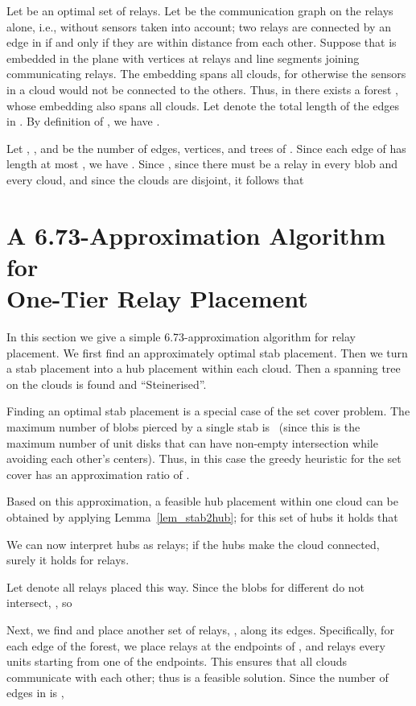 \documentclass[11pt,a4paper]{article}
\theoremstyle{definition}
\theoremstyle{remark}
\newcommand{\mytitlebreak}{\texorpdfstring{\\}{ }}
\begin{document}
Let  be an optimal set of relays.  Let  be the communication graph on the relays  alone, i.e., without sensors taken into account; two relays are connected by an edge in  if and only if they are within distance  from each other. Suppose that  is embedded in the plane with vertices at relays and line segments joining communicating relays.  The embedding spans all clouds, for otherwise the sensors in a cloud would not be connected to the others. Thus, in  there exists a forest , whose embedding also spans all clouds. Let  denote the total length of the edges in . By definition of , we have .

Let , , and  be the number of edges, vertices, and trees of .  Since each edge of  has length at most , we have . Since , since there must be a relay in every blob and every cloud, and since the clouds are disjoint, it follows that




\section{A 6.73-Approximation Algorithm for\mytitlebreak One-Tier Relay Placement}\label{sec_apx1tier}

In this section we give a simple 6.73-approximation algorithm for relay placement.  We first find an approximately optimal stab placement. Then we turn a stab placement into a hub placement within each cloud. Then a spanning tree on the clouds is found and ``Steinerised''.

Finding an optimal stab placement is a special case of the set cover problem. The maximum number of blobs pierced by a single stab is~ (since this is the maximum number of unit disks that can have non-empty intersection while avoiding each other's centers). Thus, in this case the greedy heuristic for the set cover has an approximation ratio of  \cite[Theorem~35.4]{cormen01introduction}.

Based on this approximation, a feasible hub placement  within one cloud  can be obtained by applying Lemma~\ref{lem_stab2hub}; for this set of hubs it holds that

We can now interpret hubs  as relays; if the hubs make the cloud  connected, surely it holds for relays.

Let  denote all relays placed this way. Since the blobs  for different  do not intersect, , so


Next, we find  and place another set of relays, , along its edges.  Specifically, for each edge  of the forest, we place  relays at the endpoints of , and   relays every  units starting from one of the endpoints. This ensures that all clouds communicate with each other; thus  is a feasible solution. Since the number of edges in  is ,
\end{document}
